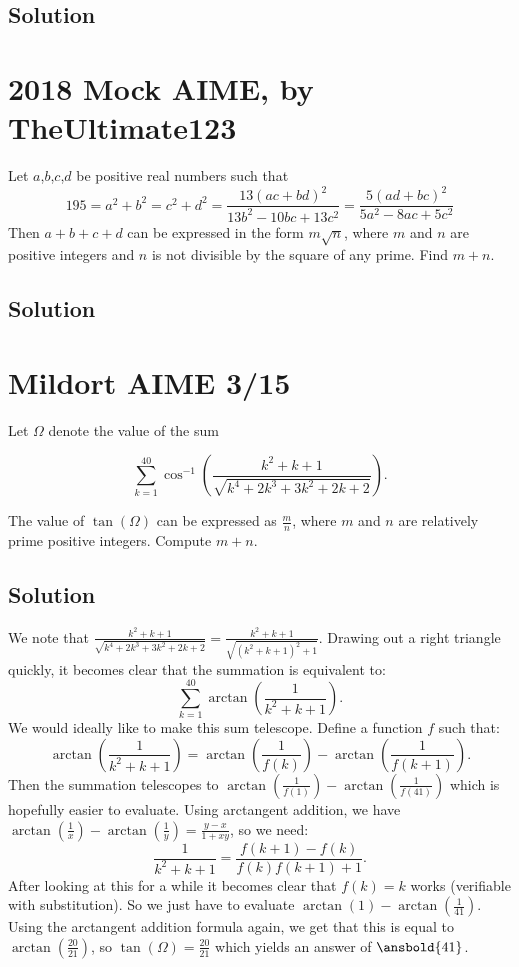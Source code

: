 \documentclass{article}
\begin{document}
\subsection{Solution}

\pagebreak\section{2018 Mock AIME, by TheUltimate123}
Let $a$,$b$,$c$,$d$ be positive real numbers such that \[195=a^2+b^2=c^2+d^2=\frac{13(ac+bd)^2}{13b^2-10bc+13c^2}=\frac{5(ad+bc)^2}{5a^2-8ac+5c^2}\] Then $a+b+c+d$ can be expressed in the form $m\sqrt{n}$, where $m$ and $n$ are positive integers and $n$ is not divisible by the square of any prime. Find $m+n$.

\subsection{Solution}

\pagebreak\section{Mildort AIME 3/15}
Let $\Omega$ denote the value of the sum

\[\sum\limits_{k=1}^{40} \cos^{-1}\left(\frac{k^2 + k + 1}{\sqrt{k^4 + 2k^3 + 3k^2 + 2k + 2}}\right).\]

The value of $\tan\left(\Omega\right)$ can be expressed as $\frac{m}{n}$, where $m$ and $n$ are relatively prime positive integers. Compute $m + n$.

\subsection{Solution}
We note that $\frac{k^2+k+1}{\sqrt{k^4+2k^3+3k^2+2k+2}}=\frac{k^2+k+1}{\sqrt{(k^2+k+1)^2+1}}$. Drawing out a right triangle quickly, it becomes clear that the summation is equivalent to:
$$\sum_{k=1}^{40} \arctan \left(\frac{1}{k^2+k+1} \right).$$
We would ideally like to make this sum telescope. Define a function $f$ such that:
$$\arctan \left(\frac{1}{k^2+k+1}\right)=\arctan \left(\frac{1}{f(k)}\right)-\arctan \left(\frac{1}{f(k+1)}\right).$$
Then the summation telescopes to $\arctan \left(\frac{1}{f(1)}\right)-\arctan \left(\frac{1}{f(41)}\right)$ which is hopefully easier to evaluate. Using arctangent addition, we have $\arctan \left(\frac{1}{x}\right)-\arctan \left(\frac{1}{y}\right)=\frac{y-x}{1+xy}$, so we need:
$$\frac{1}{k^2+k+1}=\frac{f(k+1)-f(k)}{f(k)f(k+1)+1}.$$
After looking at this for a while it becomes clear that $f(k)=k$ works (verifiable with substitution). So we just have to evaluate $\arctan(1)-\arctan \left(\frac{1}{41}\right)$. Using the arctangent addition formula again, we get that this is equal to $\arctan \left(\frac{20}{21}\right)$, so $\tan (\Omega)=\frac{20}{21}$ which yields an answer of $\ansbold{41}$.
\end{document}
